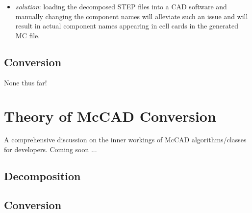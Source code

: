 \documentclass[12pt, a4paper, titlepage]{article}
\begin{document}
\begin{itemize}
\begin{itemize}
    	\item \emph{solution}: loading the decomposed STEP files into a CAD software and manually changing the component names will alleviate such an issue and will result in actual component names appearing in cell cards in the generated MC file.  
    \end{itemize} 
\end{itemize}
\subsection{Conversion}
None thus far!

\section{Theory of McCAD Conversion} \label{sec:Theory of McCAD Conversion}
A comprehensive discussion on the inner workings of McCAD algorithms/classes for developers. Coming soon ...
\subsection{Decomposition}
\subsection{Conversion}
\newpage
%

\end{document}
